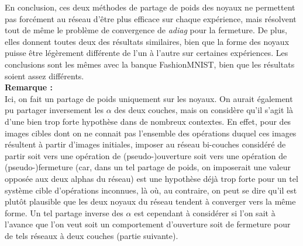 \vspace{-2.0mm}
En conclusion, ces deux méthodes de partage de poids des noyaux ne permettent pas forcément au réseau d'être plus efficace sur chaque expérience, mais résolvent tout de même le problème de convergence de \textit{adiag} pour la fermeture. De plus, elles donnent toutes deux des résultats similaires, bien que la forme des noyaux puisse être légèrement différente de l'un à l'autre sur certaines expériences. 
Les conclusions sont les mêmes avec la banque FashionMNIST, bien que les résultats soient assez différents. \\



\noindent \textbf{Remarque :} \\

\vspace{-1.6mm}
\noindent Ici, on fait un partage de poids uniquement sur les noyaux. On aurait également pu partager inversement les $\alpha$ des deux couches, mais on considère qu'il s'agit là d'une bien trop forte hypothèse dans de nombreux contextes. En effet, pour des images cibles dont on ne connait pas l'ensemble des opérations duquel ces images résultent à partir d'images initiales, imposer au réseau bi-couches considéré de partir soit vers une opération de (pseudo-)ouverture soit vers une opération de (pseudo-)fermeture (car, dans un tel partage de poids, on imposerait une valeur opposée aux deux alphas du réseau) est une hypothèse déjà trop forte pour un tel système cible d'opérations inconnues, là où, au contraire, on peut se dire qu'il est plutôt plausible que les deux noyaux du réseau tendent à converger vers la même forme. Un tel partage inverse des $\alpha$ est cependant à considérer si l'on sait à l'avance que l'on veut soit un comportement d'ouverture soit de fermeture pour de tels réseaux à deux couches (partie suivante).

